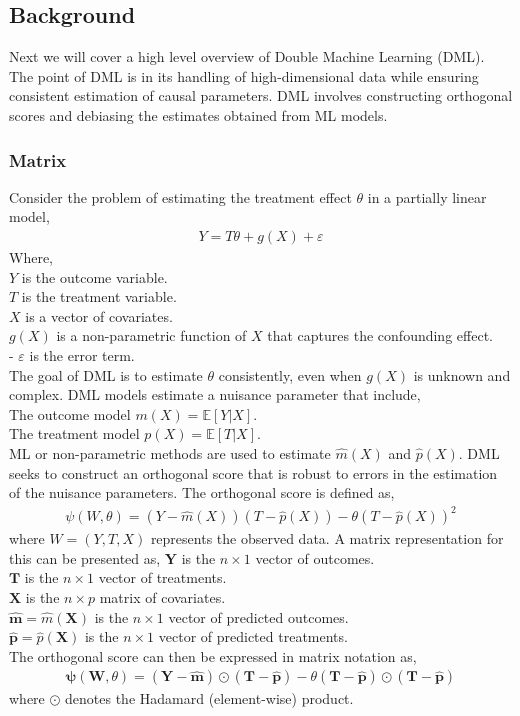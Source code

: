 \subsection{Background}
Next we will cover a high level overview of Double Machine Learning (DML). The point of DML is in its handling of high-dimensional data while ensuring consistent estimation of causal parameters. DML involves constructing orthogonal scores and debiasing the estimates obtained from ML models. 
\subsubsection{Matrix}
Consider the problem of estimating the treatment effect \(\theta\) in a partially linear model,
\begin{align}
Y = T\theta + g(X) + \varepsilon
\end{align}
Where,\\
\(Y\) is the outcome variable. \\
\(T\) is the treatment variable. \\
\(X\) is a vector of covariates. \\ 
\(g(X)\) is a non-parametric function of \(X\) that captures the confounding effect.\\
- \(\varepsilon\) is the error term. \\
The goal of DML is to estimate \(\theta\) consistently, even when \(g(X)\) is unknown and complex.
DML models estimate a nuisance parameter that include,\\
The outcome model \(m(X) = \mathbb{E}[Y | X]\). \\
The treatment model \(p(X) = \mathbb{E}[T | X]\). \\
ML or non-parametric methods are used to estimate \(\hat{m}(X)\) and \(\hat{p}(X)\). DML seeks to construct an orthogonal score that is robust to errors in  the estimation of the nuisance parameters. The orthogonal score is defined as,
\begin{align}
\psi(W, \theta) = \left( Y - \hat{m}(X) \right)\left( T - \hat{p}(X) \right) - \theta \left( T - \hat{p}(X) \right)^2
\end{align}
where \(W = (Y, T, X)\) represents the observed data.
A matrix representation for this can be presented as,
\( \mathbf{Y} \) is the \(n \times 1\) vector of outcomes. \\
\( \mathbf{T} \) is the \(n \times 1\) vector of treatments. \\
\( \mathbf{X} \) is the \(n \times p\) matrix of covariates. \\
\( \hat{\mathbf{m}} = \hat{m}(\mathbf{X}) \) is the \(n \times 1\) vector of predicted outcomes. \\
\( \hat{\mathbf{p}} = \hat{p}(\mathbf{X}) \) is the \(n \times 1\) vector of predicted treatments.\\
The orthogonal score can then be expressed in matrix notation as,
\begin{align}
\boldsymbol{\psi}(\mathbf{W}, \theta) = (\mathbf{Y} - \hat{\mathbf{m}}) \odot (\mathbf{T} - \hat{\mathbf{p}}) - \theta (\mathbf{T} - \hat{\mathbf{p}}) \odot (\mathbf{T} - \hat{\mathbf{p}})
\end{align}
where \( \odot \) denotes the Hadamard (element-wise) product.
